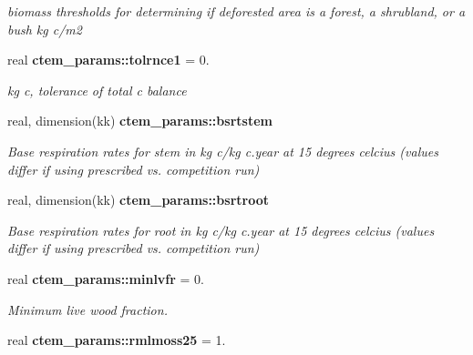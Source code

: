 \begin{DoxyCompactItemize}
\begin{DoxyCompactList}\small\item\em biomass thresholds for determining if deforested area is a forest, a shrubland, or a bush kg c/m2 \end{DoxyCompactList}\item 
\hypertarget{namespacectem__params_a1ecb947f804fa8a4db85cb4524c12957}{}real {\bfseries ctem\+\_\+params\+::tolrnce1} = 0.\label{namespacectem__params_a1ecb947f804fa8a4db85cb4524c12957}

\begin{DoxyCompactList}\small\item\em kg c, tolerance of total c balance \end{DoxyCompactList}\item 
\hypertarget{namespacectem__params_a3e315466e92bff767c21df28defa0a96}{}real, dimension(kk) {\bfseries ctem\+\_\+params\+::bsrtstem}\label{namespacectem__params_a3e315466e92bff767c21df28defa0a96}

\begin{DoxyCompactList}\small\item\em Base respiration rates for stem in kg c/kg c.\+year at 15 degrees celcius (values differ if using prescribed vs. competition run) \end{DoxyCompactList}\item 
\hypertarget{namespacectem__params_a38e12fbd4194b73db2a5d635ffb9701b}{}real, dimension(kk) {\bfseries ctem\+\_\+params\+::bsrtroot}\label{namespacectem__params_a38e12fbd4194b73db2a5d635ffb9701b}

\begin{DoxyCompactList}\small\item\em Base respiration rates for root in kg c/kg c.\+year at 15 degrees celcius (values differ if using prescribed vs. competition run) \end{DoxyCompactList}\item 
\hypertarget{namespacectem__params_afd2af8cee888fd84bf7e89a6a2b5c981}{}real {\bfseries ctem\+\_\+params\+::minlvfr} = 0.\label{namespacectem__params_afd2af8cee888fd84bf7e89a6a2b5c981}

\begin{DoxyCompactList}\small\item\em Minimum live wood fraction. \end{DoxyCompactList}\item 
\hypertarget{namespacectem__params_acedcadb21474712e7f4a90bfb98ee661}{}real {\bfseries ctem\+\_\+params\+::rmlmoss25} = 1.\label{namespacectem__params_acedcadb21474712e7f4a90bfb98ee661}


\end{DoxyCompactItemize}
